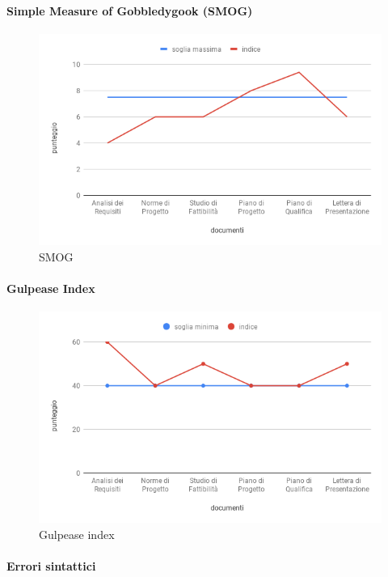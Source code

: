 \paragraph{Simple Measure of Gobbledygook (SMOG)}
\begin{figure}[h]
	\centering
	\includegraphics[width=\textwidth]{Smog.png}
	\caption{SMOG}
\end{figure}

\paragraph{Gulpease Index}
\begin{figure}[h]
	\centering
	\includegraphics[width=\textwidth]{GulpeaseIndex.png}
	\caption{Gulpease index}
\end{figure}

\paragraph{Errori sintattici}


